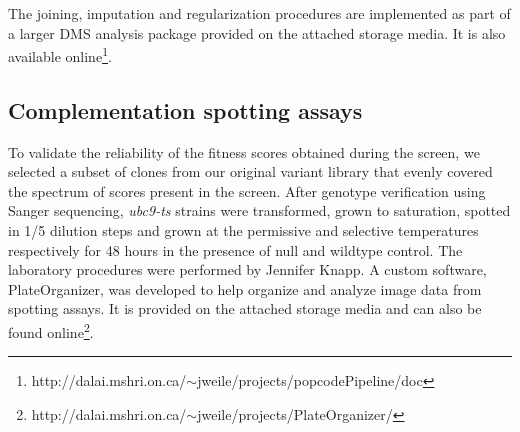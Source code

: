 The joining, imputation and regularization procedures are implemented as part of a larger DMS analysis package provided on the attached storage media. It is also available online\footnote{http://dalai.mshri.on.ca/$\sim$jweile/projects/popcodePipeline/doc}.

\subsection{Complementation spotting assays}
To validate the reliability of the fitness scores obtained during the screen, we selected a subset of clones from our original variant library that evenly covered the spectrum of scores present in the screen. After genotype verification using Sanger sequencing,  \textit{ubc9-ts} strains were transformed, grown to saturation, spotted in 1/5 dilution steps and grown at the permissive and selective temperatures respectively for 48 hours in the presence of null and wildtype control. The laboratory procedures were performed by Jennifer Knapp. A custom software, PlateOrganizer, was developed to help organize and analyze image data from spotting assays. It is provided on the attached storage media and can also be found online\footnote{http://dalai.mshri.on.ca/$\sim$jweile/projects/PlateOrganizer/}.

